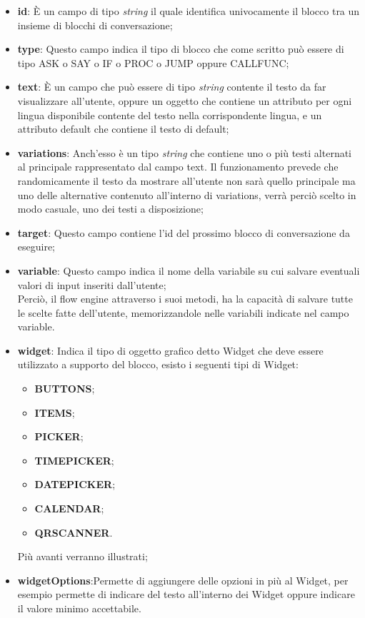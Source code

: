 \begin{itemize}
	\item \textbf{id}: È un campo di tipo \emph{string} il quale identifica univocamente il blocco tra un insieme di blocchi di conversazione;
	\item \textbf{type}: Questo campo indica il tipo di blocco che come scritto può essere di tipo ASK
	 o SAY o IF o PROC o JUMP oppure CALLFUNC;        
	\item \textbf{text}: È un campo che può essere di tipo \emph{string} contente il testo da far visualizzare all'utente, oppure un oggetto che contiene un attributo per ogni lingua disponibile contente del testo nella corrispondente lingua, e un attributo default che contiene il testo di default;
	\item \textbf{variations}: Anch'esso è un tipo \emph{string} che contiene uno o più testi alternati al principale rappresentato dal campo text. Il funzionamento prevede che randomicamente il testo da mostrare all'utente non sarà quello principale ma uno delle alternative contenuto all'interno di variations, verrà perciò scelto in modo casuale, uno dei testi a disposizione; 
	\item \textbf{target}: Questo campo contiene l'id del prossimo blocco di conversazione da eseguire;
	\item \textbf{variable}: Questo campo indica il nome della variabile su cui salvare eventuali valori di input inseriti dall'utente; \\
	Perciò, il flow engine attraverso i suoi metodi, ha la capacità di salvare tutte le scelte fatte dell'utente, memorizzandole nelle variabili indicate nel campo variable.
	\item \textbf{widget}: Indica il tipo di oggetto grafico detto Widget che deve essere utilizzato a supporto del blocco, esisto i seguenti tipi di Widget:
	\begin{itemize}
		\item \textbf{BUTTONS};
		\item \textbf{ITEMS};
		\item \textbf{PICKER};
		\item \textbf{TIMEPICKER};
		\item \textbf{DATEPICKER};
		\item \textbf{CALENDAR};
		\item \textbf{QRSCANNER}.
	\end{itemize}
	Più avanti verranno illustrati;
	\item \textbf{widgetOptions}:Permette di aggiungere delle opzioni in più al Widget, per esempio permette di indicare del testo all'interno dei Widget oppure indicare il valore minimo accettabile.
\end{itemize} 


